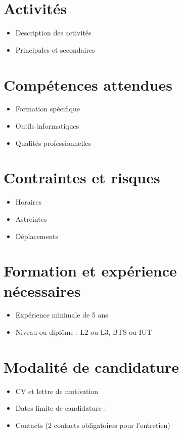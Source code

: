 \documentclass{ipgpoffreemploi}
\begin{document}
\section*{Activités}

\begin{itemize}
\item Description des activités
\item Principales et secondaires
\end{itemize}

\section*{Compétences attendues}

\begin{itemize}
\item Formation spécifique
\item Outils informatiques
\item Qualités professionnelles
\end{itemize}

\section*{Contraintes et risques}

\begin{itemize}
\item Horaires
\item Astreintes
\item Déplacements
\end{itemize}

\section*{Formation et expérience nécessaires}

\begin{itemize}
\item Expérience minimale de 5 ans
\item Niveau ou diplôme : L2 ou L3, BTS ou IUT
\end{itemize}

\section*{Modalité de candidature}

\begin{itemize}
\item CV et lettre de motivation
\item Dates limite de candidature :
\item Contacts (2 contacts obligatoires pour l’entretien)
\end{itemize}
\end{document}
